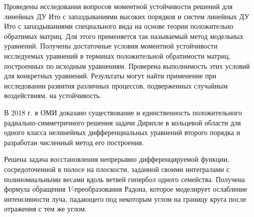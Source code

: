 Проведены исследования вопросов моментной устойчивости решений для линейных ДУ Ито с
запаздываниями высоких порядков и систем линейных ДУ Ито с запаздываниями специального вида на
основе теории положительно обратимых матриц. Для этого применяется так называемый метод модельных уравнений.
Получены достаточные условия моментной устойчивости исследуемых уравнений в терминах положительной обратимости матриц, построенных по исходным уравнениям.
Проверена выполнимость этих условий для конкретных уравнений.
Результаты могут найти применение при исследовании развития различных процессов, подверженных случайным воздействиям, на  устойчивость.









В 2018 г. в ОМИ доказано существование и единственность положительного радиально-симметричного решения задачи Дирихле в кольцевой области для одного класса нелинейных дифференциальных уравнений второго порядка и разработан численный метод его построения.




Решена задача восстановления непрерывно дифференцируемой функции, сосредоточенной в полосе на плоскости, заданной своими интегралами с полиномиальными весами вдоль ветвей гипербол одного семейства.
Получена формула обращения $V$-преобразования Радона, которое моделирует ослабление интенсивности луча, падающего под некоторым углом на границу круга после отражения с тем же углом.









